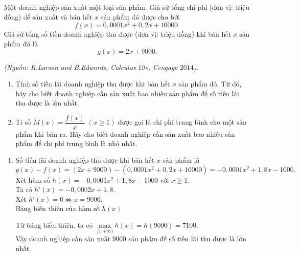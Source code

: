 \begin{bt}%
	Một doanh nghiệp sản xuất một loại sản phẩm. Giả sử tổng chi phí (đơn vị: triệu đồng) để sản xuất và bán hết $x$ sản phẩm đó được cho bởi
	$$f(x)=0{,}0001x^2+0{,}2x+10000.$$
	Giả sử tổng số tiền doanh nghiệp thu được (đơn vị: triệu đồng) khi bán hết $x$ sản phẩm đó là
	$$g(x)=2x+9000.$$
	\begin{flushright}
		\textit{(Nguồn: R.Larson and B.Edwards, Calculus $10$e, Cengage $2014$).}
	\end{flushright}
	\begin{enumerate}
		\item Tính số tiền lãi doanh nghiệp thu được khi bán hết $x$ sản phẩm đó. Từ đó, hãy cho biết doanh nghiệp cần sản xuất bao nhiêu sản phẩm để số tiền lãi thu được là lớn nhất.
		\item Tỉ số $M(x)=\dfrac{f(x)}{x}$ $(x\geqslant1)$ được gọi là chi phí trung bình cho một sản phẩm khi bán ra. Hãy cho biết doanh nghiệp cần sản xuất bao nhiêu sản phẩm để chi phí trung bình là nhỏ nhất.
	\end{enumerate}
	\loigiai
	{
		\begin{enumerate}
			\item
			Số tiền lãi doanh nghiệp thu được khi bán hết $x$ sản phẩm là
			$$g(x)-f(x)=(2x+9000)-\left(0{,}0001x^2+0{,}2x+10000\right)=-0{,}0001x^2+1{,}8x-1000.$$
			Xét hàm số $h(x)=-0{,}0001x^2+1{,}8x-1000$ với $x\geqslant1$. \\
			Ta có $h'(x)=-0{,}0002x+1{,}8$. \\
			Xét $h'(x)=0 \Leftrightarrow x=9000$. \\
			Bảng biến thiên của hàm số $h(x)$
			\begin{center}
			\end{center}
			Từ bảng biến thiên, ta có $\max\limits_{[1;+\infty)} h(x)=h(9000)=7100$. \\
			Vậy doanh nghiệp cần sản xuất $9000$ sản phẩm để số tiền lãi thu được là lớn nhất.

\end{enumerate}}
\end{bt}
